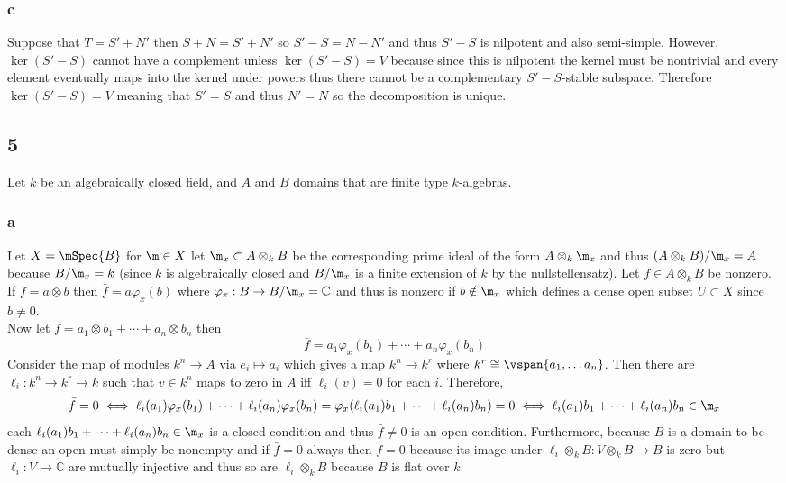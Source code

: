 \documentclass[12pt]{article}
\renewcommand{\C}{\mathbb{C}}
\begin{document}
\subsubsection{c}

Suppose that $T = S' + N'$ then $S + N = S' + N'$ so $S' - S = N - N'$ and thus $S' - S$ is nilpotent and also semi-simple. However, $\ker{(S' - S)}$ cannot have a complement unless $\ker{(S' - S)} = V$ because since this is nilpotent the kernel must be nontrivial and every element eventually maps into the kernel under powers thus there cannot be a complementary $S' - S$-stable subspace. Therefore $\ker{(S' - S)} = V$ meaning that $S' = S$ and thus $N' = N$ so the decomposition is unique.


\subsection{5}

Let $k$ be an algebraically closed field, and $A$ and $B$ domains that are finite type $k$-algebras.

\subsubsection{a}

Let $X = \mSpec{B}$ for $\m \in X$ let $\m_x \subset A \otimes_k B$ be the corresponding prime ideal of the form $A \otimes_k \m_x$ and thus $(A \otimes_k B)/\m_x = A$ because $B / \m_x = k$ (since $k$ is algebraically closed and $B / \m_x$ is a finite extension of $k$ by the nullstellensatz). Let $f \in A \otimes_k B$ be nonzero. If $f = a \otimes b$ then $\bar{f} = a \varphi_x(b)$ where $\varphi_x : B \to B / \m_x = \C$ and thus is nonzero if $b \notin \m_x$ which defines a dense open subset $U \subset X$ since $b \neq 0$.
\bigskip\\
Now let $f = a_1 \otimes b_1 + \cdots + a_n \otimes b_n$ then 
\[ \bar{f} = a_1 \varphi_x(b_1) + \cdots + a_n \varphi_x(b_n) \]
Consider the map of modules $k^n \to A$ via $e_i \mapsto a_i$ which gives a map $k^n \to k^r$ where $k^r \cong \vspan\{ a_1, \dots a_n \}$. Then there are $\ell_i : k^n \to k^r \to k$ such that $v \in k^n$ maps to zero in $A$ iff $\ell_i(v) = 0$ for each $i$. Therefore,
\[ \bar{f} = 0 \iff \ell_i(a_1) \varphi_x(b_1) + \cdots + \ell_i(a_n) \varphi_x(b_n) = \varphi_x( \ell_i(a_1) b_1 + \cdots + \ell_i(a_n) b_n) = 0 \iff \ell_i(a_1) b_1 + \cdots + \ell_i(a_n) b_n \in \m_x \]
each $\ell_i(a_1) b_1 + \cdots + \ell_i(a_n) b_n \in \m_x$ is a closed condition and thus $\bar{f} \neq 0$ is an open condition. Furthermore, because $B$ is a domain to be dense an open must simply be nonempty and if $\bar{f} = 0$ always then $f = 0$ because its image under $\ell_i \otimes_k B : V \otimes_k B \to B$ is zero but $\ell_i : V \to \C$ are mutually injective and thus so are $\ell_i \otimes_k B$ because $B$ is flat over $k$.
\end{document}
